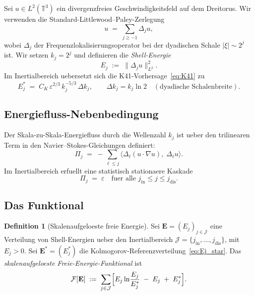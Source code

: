 \documentclass[12pt,a4paper]{article}
\theoremstyle{definition}
\newtheorem{definition}{Definition}[section]
\theoremstyle{plain}
\theoremstyle{remark}
\begin{document}
Sei $u \in L^2(\mathbb{T}^3)$ ein divergenzfreies Geschwindigkeitsfeld auf
dem Dreitorus. Wir verwenden die Standard-Littlewood--Paley-Zerlegung
\begin{equation}\label{eq:LP}
  u \;=\; \sum_{j \ge -1} \Delta_j u,
\end{equation}
wobei $\Delta_j$ der Frequenzlokalisierungsoperator bei der dyadischen
Schale $|\xi| \sim 2^j$ ist. Wir setzen $k_j = 2^j$ und definieren die
\emph{Shell-Energie}
\begin{equation}\label{eq:Ej}
  E_j \;:=\; \|\Delta_j u\|_{L^2}^2.
\end{equation}
Im Inertialbereich uebersetzt sich die K41-Vorhersage~\eqref{eq:K41} zu
\begin{equation}\label{eq:Ej_star}
  E_j^* \;=\; C_K\, \varepsilon^{2/3}\, k_j^{-5/3} \,\Delta k_j,
  \qquad \Delta k_j = k_j \ln 2 \quad (\text{dyadische Schalenbreite}).
\end{equation}

\subsection{Energiefluss-Nebenbedingung}

Der Skala-zu-Skala-Energiefluss durch die Wellenzahl $k_j$ ist ueber den
trilinearen Term in den Navier--Stokes-Gleichungen definiert:
\begin{equation}\label{eq:flux}
  \Pi_j \;=\; -\sum_{\ell \le j}
    \langle \Delta_\ell(u \cdot \nabla u),\; \Delta_\ell u \rangle.
\end{equation}
Im Inertialbereich erfuellt eine statistisch stationaere Kaskade
\begin{equation}\label{eq:const_flux}
  \Pi_j \;=\; \varepsilon \quad \text{fuer alle } j_{\mathrm{in}} \le j \le j_{\mathrm{dis}}.
\end{equation}

\subsection{Das Funktional}

\begin{definition}[Skalenaufgeloeste freie Energie]\label{def:F}
Sei $\mathbf{E} = (E_j)_{j \in \mathcal{J}}$ eine Verteilung von
Shell-Energien ueber den Inertialbereich $\mathcal{J} = \{j_{\mathrm{in}}, \dots,
j_{\mathrm{dis}}\}$, mit $E_j > 0$. Sei $\mathbf{E}^* = (E_j^*)$ die
Kolmogorov-Referenzverteilung~\eqref{eq:Ej_star}. Das
\emph{skalenaufgeloeste Freie-Energie-Funktional} ist
\begin{equation}\label{eq:F}
  \mathcal{F}[\mathbf{E}]
  \;:=\;
  \sum_{j \in \mathcal{J}}
  \Bigl[
    E_j \ln\!\frac{E_j}{E_j^*} \;-\; E_j \;+\; E_j^*
  \Bigr].
\end{equation}
\end{definition}
\end{document}
